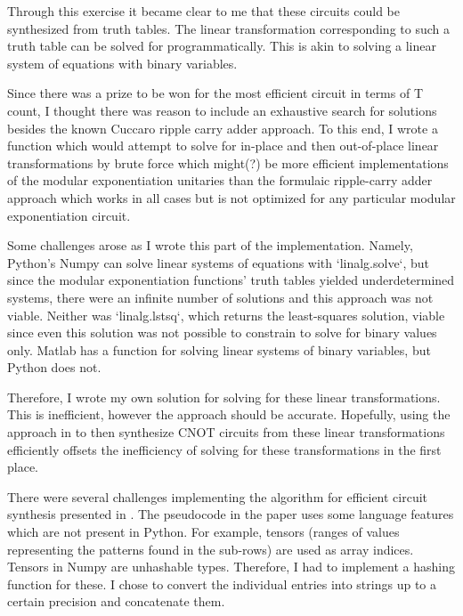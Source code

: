 \documentclass{article}
\begin{document}
Through this exercise it became clear to me that these circuits could be synthesized from truth tables. The linear transformation corresponding to such a truth table can be solved for programmatically. This is akin to solving a linear system of equations with binary variables.

Since there was a prize to be won for the most efficient circuit in terms of T count, I thought there was reason to include an exhaustive search for solutions besides the known Cuccaro ripple carry adder approach. To this end, I wrote a function which would attempt to solve for in-place and then out-of-place linear transformations by brute force which might(?) be more efficient implementations of the modular exponentiation unitaries than the formulaic ripple-carry adder approach which works in all cases but is not optimized for any particular modular exponentiation circuit.

Some challenges arose as I wrote this part of the implementation. Namely, Python's Numpy can solve linear systems of equations with `linalg.solve`, but since the modular exponentiation functions' truth tables yielded underdetermined systems, there were an infinite number of solutions and this approach was not viable. Neither was `linalg.lstsq`, which returns the least-squares solution, viable since even this solution was not possible to constrain to solve for binary values only. Matlab has a function for solving linear systems of binary variables, but Python does not.

Therefore, I wrote my own solution for solving for these linear transformations. This is inefficient, however the approach should be accurate. Hopefully, using the approach in \cite{patel_efficient_2003} to then synthesize CNOT circuits from these linear transformations efficiently offsets the inefficiency of solving for these transformations in the first place.

There were several challenges implementing the algorithm for efficient circuit synthesis presented in \cite{patel_efficient_2003}. The pseudocode in the paper uses some language features which are not present in Python. For example, tensors (ranges of values representing the patterns found in the sub-rows) are used as array indices. Tensors in Numpy are unhashable types. Therefore, I had to implement a hashing function for these. I chose to convert the individual entries into strings up to a certain precision and concatenate them. 
\end{document}
